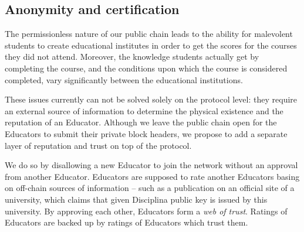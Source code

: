 \subsection{Anonymity and certification}
\label{sec:cert}
The permissionless nature of our public chain leads to the ability for malevolent students to create educational institutes in order to get the scores for the courses they did not attend. Moreover, the knowledge students actually get by completing the course, and the conditions upon which the course is considered completed, vary significantly between the educational institutions.

These issues currently can not be solved solely on the protocol level: they require an external source of information to determine the physical existence and the reputation of an Educator. Although we leave the public chain open for the Educators to submit their private block headers, we propose to add a separate layer of reputation and trust on top of the protocol.

We do so by disallowing a new Educator to join the network without an approval
from another Educator. Educators are supposed to rate another Educators basing
on off-chain sources of information -- such as a publication on an official site
of a university, which claims that given Disciplina public key is issued by this
university. By approving each other, Educators form a \textit{web of trust}.
Ratings of Educators are backed up by ratings of Educators which trust them.
